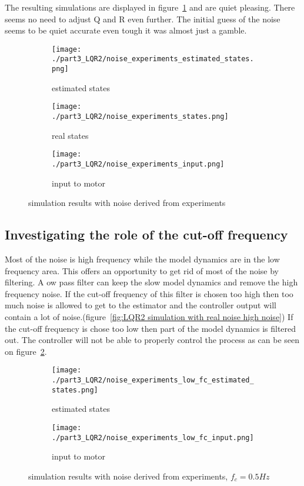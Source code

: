 	The resulting simulations are displayed in figure~\ref{fig:LQR2 simulation with real noise} and are quiet pleasing. There seems no need to adjust Q and R even further. The initial guess of the noise seems to be quiet accurate even tough it was almost just a gamble.
	\begin{figure}[H]
		\centering
		\begin{subfigure}[b]{0.45\textwidth}
			\texttt{[image: ./part3\_LQR2/noise\_experiments\_estimated\_states.png]}
			\caption{estimated states}
		\end{subfigure}
		\begin{subfigure}[b]{0.45\textwidth}
			\texttt{[image: ./part3\_LQR2/noise\_experiments\_states.png]}
			\caption{real states}
		\end{subfigure}
		\begin{subfigure}[b]{0.45\textwidth}
			\texttt{[image: ./part3\_LQR2/noise\_experiments\_input.png]}
			\caption{input to motor}
		\end{subfigure}
		\caption{simulation results with noise derived from experiments}
		\label{fig:LQR2 simulation with real noise}
	\end{figure}

\subsection{Investigating the role of the cut-off frequency}
Most of the noise is high frequency while the model dynamics are in the low frequency area. This offers an opportunity to get rid of most of the noise by filtering. A ow pass filter can keep the slow model dynamics and remove the high frequency noise. If the cut-off frequency of this filter is chosen too high then too much noise is allowed to get to the estimator and the controller output will contain a lot of noise.(figure~\ref{fig:LQR2 simulation with real noise high noise}) If the cut-off frequency is chose too low then part of the model dynamics is filtered out. The controller will not be able to properly control the process as can be seen on figure~\ref{fig:LQR2 simulation with real noise low noise}.

\begin{figure}[H]
	\centering
	\begin{subfigure}[b]{0.45\textwidth}
		\texttt{[image: ./part3\_LQR2/noise\_experiments\_low\_fc\_estimated\_states.png]}
		\caption{estimated states}
	\end{subfigure}
	\begin{subfigure}[b]{0.45\textwidth}
		\texttt{[image: ./part3\_LQR2/noise\_experiments\_low\_fc\_input.png]}
		\caption{input to motor}
	\end{subfigure}
	\caption{simulation results with noise derived from experiments, $f_c=0.5Hz$}
	\label{fig:LQR2 simulation with real noise low noise}
\end{figure}

